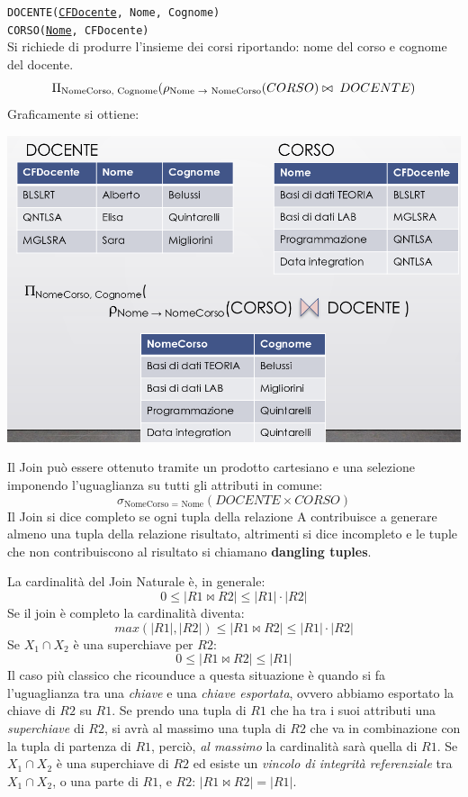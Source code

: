 \documentclass{report}
\begin{document}
\noindent\texttt{DOCENTE(\underline{CFDocente}, Nome, Cognome) \\
CORSO(\underline{Nome}, CFDocente)}\\

\noindent Si richiede di produrre l'insieme dei corsi riportando: nome del corso e cognome del docente.
\[ \Pi_{\text{NomeCorso, Cognome}}(\rho_{\text{Nome $\to$ NomeCorso}}(CORSO) \bowtie \thickspace DOCENTE)\]
Graficamente si ottiene:

\begin{center}
\includegraphics[scale=0.35]{join_example}
\end{center}


Il Join può essere ottenuto tramite un prodotto cartesiano e una selezione imponendo l’uguaglianza su tutti gli attributi in comune:\\
\[\sigma_{\text{NomeCorso = Nome}}(DOCENTE \times CORSO)\]
Il Join si dice completo se ogni tupla della relazione A contribuisce a generare almeno una tupla della relazione risultato, altrimenti si dice incompleto e le tuple che non contribuiscono al risultato si chiamano \textbf{dangling tuples}.

La cardinalità del Join Naturale è, in generale:
\[0 \leq |R1 \bowtie R2| \leq |R1| \cdot |R2|\]
Se il join \`e completo la cardinalit\`a diventa:
\[ max(|R1|, |R2|) \leq |R1 \bowtie R2| \leq |R1| \cdot |R2| \]
Se $X_1 \cap X_2$ \`e una superchiave per $R2$:
\[ 0 \le |R1 \bowtie R2| \leq |R1| \]
Il caso pi\`u classico che ricounduce a questa situazione \`e quando si fa l'uguaglianza tra una \emph{chiave} e una \emph{chiave esportata}, ovvero abbiamo esportato la chiave di $R2$ su $R1$. Se prendo una tupla di $R1$ che ha tra i suoi attributi una \emph{superchiave} di $R2$, si avr\`a al massimo una tupla di $R2$ che va in combinazione con la tupla di partenza di $R1$, perci\`o, \emph{al massimo} la cardinalit\`a sar\`a quella di $R1$. Se $X_1 \cap X_2$ \`e una superchiave di $R2$ ed esiste un \emph{vincolo di integrit\`a referenziale} tra $X_1 \cap X_2$, o una parte di $R1$, e $R2$: $|R1 \bowtie R2| = |R1|$.
\end{document}
